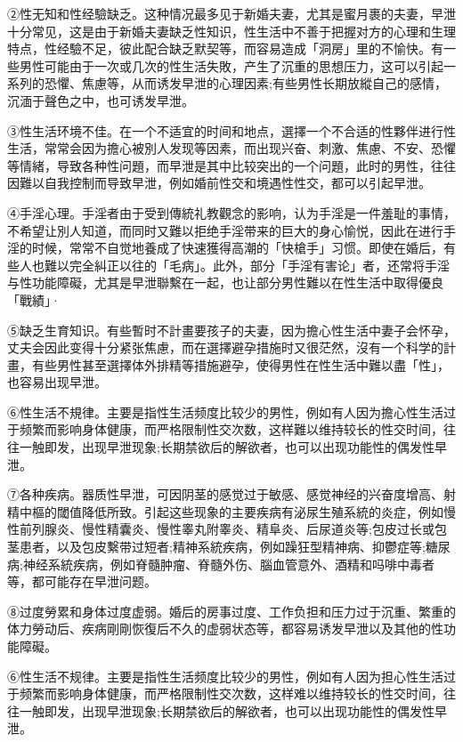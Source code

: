 \documentclass[12pt,UTF8]{ctexbook}
\begin{document}
②性无知和性经驗缺乏。这种情况最多见于新婚夫妻，尤其是蜜月裹的夫妻，早泄十分常见，这是由于新婚夫妻缺乏性知识，性生活中不善于把握对方的心理和生理特点，性经驗不足，彼此配合缺乏默契等，而容易造成「洞房」里的不愉快。有一些男性可能由于一次或几次的性生活失敗，产生了沉重的思想压力，这可以引起一系列的恐懼、焦慮等，从而诱发早泄的心理因素;有些男性长期放縱自己的感情，沉湎于聲色之中，也可诱发早泄。

③性生活环境不佳。在一个不适宜的时间和地点，選擇一个不合适的性夥伴进行性生活，常常会因为擔心被別人发现等因素，而出现兴奋、刺激、焦慮、不安、恐懼等情緒，导致各种性问題，而早泄是其中比较突出的一个问題，此时的男性，往往因難以自我控制而导致早泄，例如婚前性交和境遇性性交，都可以引起早泄。

④手淫心理。手淫者由于受到傳統礼教觀念的影响，认为手淫是一件羞耻的事情，不希望让別人知道，而同时又難以拒绝手淫带来的巨大的身心愉悦，因此在进行手淫的时候，常常不自觉地養成了快速獲得高潮的「快槍手」习惯。即使在婚后，有些人也難以完全糾正以往的「毛病」。此外，部分「手淫有害论」者，还常将手淫与性功能障礙，尤其是早泄聯繫在一起，也让部分男性難以在性生活中取得優良「戰績」·

⑤缺乏生育知识。有些暫时不計畫要孩子的夫妻，因为擔心性生活中妻子会怀孕，丈夫会因此变得十分紧张焦慮，而在選擇避孕措施时又很茫然，沒有一个科学的計畫，有些男性甚至選擇体外排精等措施避孕，使得男性在性生活中難以盡「性」，也容易出现早泄。

⑥性生活不規律。主要是指性生活频度比较少的男性，例如有人因为擔心性生活过于频繁而影响身体健康，而严格限制性交次数，这样難以维持较长的性交时间，往往一触即发，出现早泄现象;长期禁欲后的解欲者，也可以出现功能性的偶发性早泄。

⑦各种疾病。器质性早泄，可因阴茎的感觉过于敏感、感觉神经的兴奋度增高、射精中樞的閾值降低所致。引起这些现象的主要疾病有泌尿生殖系統的炎症，例如慢性前列腺炎、慢性精囊炎、慢性睾丸附睾炎、精阜炎、后尿道炎等;包皮过长或包茎患者，以及包皮繫带过短者;精神系統疾病，例如躁狂型精神病、抑鬱症等;糖尿病;神经系統疾病，例如脊髓肿瘤、脊髓外伤、腦血管意外、酒精和吗啡中毒者等，都可能存在早泄问题。

⑧过度勞累和身体过度虚弱。婚后的房事过度、工作负担和压力过于沉重、繁重的体力勞动后、疾病剛剛恢復后不久的虚弱状态等，都容易诱发早泄以及其他的性功能障礙。

⑥性生活不规律。主要是指性生活频度比较少的男性，例如有人因为担心性生活过于频繁而影响身体健康，而严格限制性交次数，这样难以维持较长的性交时间，往往一触即发，出现早泄现象;长期禁欲后的解欲者，也可以出现功能性的偶发性早泄。
\end{document}
